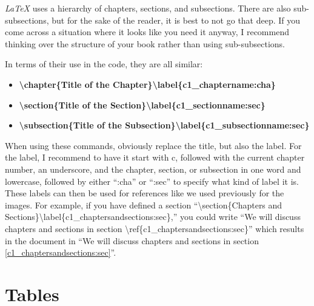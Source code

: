 \textit{LaTeX} uses a hierarchy of chapters, sections, and subsections. There are also sub-subsections, but for the sake of the reader, it is best to not go that deep. If you come across a situation where it looks like you need it anyway, I recommend thinking over the structure of your book rather than using sub-subsections. 

In terms of their use in the code, they are all similar:

\begin{itemize}
\item \textbf{\textbackslash chapter\{Title of the Chapter\}\textbackslash label\{c1\_chaptername:cha\}}
\item \textbf{\textbackslash section\{Title of the Section\}\textbackslash label\{c1\_sectionname:sec\}}
\item \textbf{\textbackslash subsection\{Title of the Subsection\}\textbackslash label\{c1\_subsectionname:sec\}}
\end{itemize}

When using these commands, obviously replace the title, but also the label. For the label, I recommend to have it start with c, followed with the current chapter number, an underscore, and the chapter, section, or subsection in one word and lowercase, followed by either ``:cha'' or ``:sec'' to specify what kind of label it is. These labels can then be used for references like we used previously for the images. For example, if you have defined a section ``\textbackslash section\{Chapters and Sections\}\textbackslash label\{c1\_chaptersandsections:sec\},'' you could write ``We will discuss chapters and sections in section \textbackslash ref\{c1\_chaptersandsections:sec\}'' which results in the document in ``We will discuss chapters and sections in section \ref{c1_chaptersandsections:sec}''.


\section{Tables}\label{c1_tables:sec}

